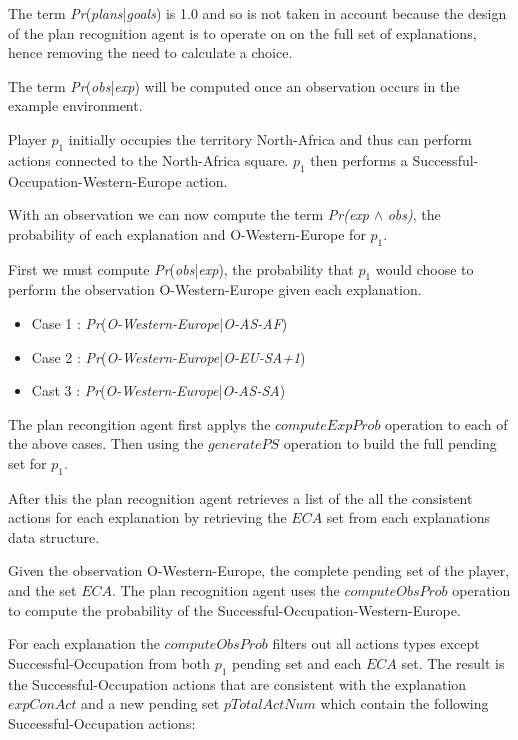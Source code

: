 \documentclass[parskip]{cs4rep}
\begin{document}
The term \textit{Pr}(\textit{plans}|\textit{goals}) is 1.0 and so is not taken in account because the design of the plan recognition agent is to operate on on the full set of explanations, hence removing the need to calculate a choice.

The term \textit{Pr}(\textit{obs}|\textit{exp}) will be computed once an observation occurs in the example environment.

Player $p_1$ initially occupies the territory North-Africa and thus can perform actions connected to the North-Africa square. $p_1$ then performs a Successful-Occupation-Western-Europe action.

With an observation we can now compute the term \textit{Pr(exp} $\wedge$ \textit{obs)}, the probability of each explanation and O-Western-Europe for $p_1$.

First we must compute \textit{Pr}(\textit{obs}|\textit{exp}), the probability that $p_1$ would choose to perform the observation O-Western-Europe given each explanation.

\begin{itemize}
\item
Case 1 : \textit{Pr}(\textit{O-Western-Europe}|\textit{O-AS-AF})
\item
Case 2 : \textit{Pr}(\textit{O-Western-Europe}|\textit{O-EU-SA+1})
\item
Cast 3 : \textit{Pr}(\textit{O-Western-Europe}|\textit{O-AS-SA})
\end{itemize}

The plan recongition agent first applys the $computeExpProb$ operation to each of the above cases. Then using the $generatePS$ operation to build the full pending set for $p_1$.

After this the plan recognition agent retrieves a list of the all the consistent actions for each explanation by retrieving the $ECA$ set from each explanations data structure.

Given the observation O-Western-Europe, the complete pending set of the player, and the set $ECA$. The plan recognition agent uses the $computeObsProb$ operation to compute the probability of the Successful-Occupation-Western-Europe.

For each explanation the $computeObsProb$ filters out all actions types except Successful-Occupation from both $p_1$ pending set and each $ECA$ set. The result is the Successful-Occupation actions that are consistent with the explanation $expConAct$ and a new pending set $pTotalActNum$ which contain the following Successful-Occupation actions:\newline
\end{document}
